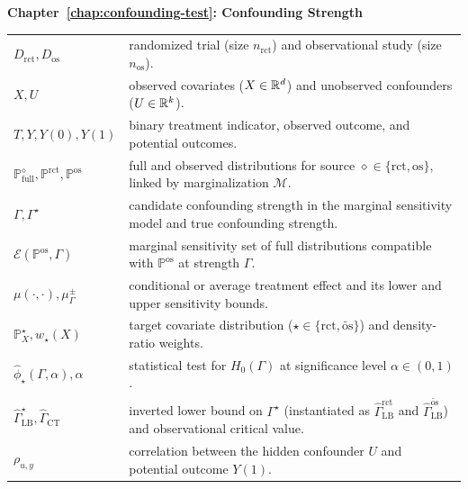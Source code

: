 \medskip
\noindent\textbf{Chapter~\ref{chap:confounding-test}: Confounding Strength}\par\smallskip
\begin{tabularx}{\textwidth}{lX}
  \(D_{\mathrm{rct}}, D_{\mathrm{os}}\) & randomized trial (size \(n_{\mathrm{rct}}\)) and observational study (size \(n_{\mathrm{os}}\)). \\
  \(X, U\) & observed covariates (\(X \in \mathbb{R}^d\)) and unobserved confounders (\(U \in \mathbb{R}^k\)). \\
  \(T, Y, Y(0), Y(1)\) & binary treatment indicator, observed outcome, and potential outcomes. \\
  \(\mathbb{P}^{\diamond}_{\mathrm{full}}, \mathbb{P}^{\mathrm{rct}}, \mathbb{P}^{\mathrm{os}}\) & full and observed distributions for source \(\diamond \in \{\mathrm{rct}, \mathrm{os}\}\), linked by marginalization \(\mathcal{M}\). \\
  \(\Gamma, \Gamma^{\star}\) & candidate confounding strength in the marginal sensitivity model and true confounding strength. \\
  \(\mathcal{E}(\mathbb{P}^{\mathrm{os}}, \Gamma)\) & marginal sensitivity set of full distributions compatible with \(\mathbb{P}^{\mathrm{os}}\) at strength \(\Gamma\). \\
  \(\mu(\cdot,\cdot), \mu^{\pm}_{\Gamma}\) & conditional or average treatment effect and its lower and upper sensitivity bounds. \\
  \(\mathbb{P}^{\star}_X, w_{\star}(X)\) & target covariate distribution (\(\star \in \{\mathrm{rct}, \widetilde{\mathrm{os}}\}\)) and density-ratio weights. \\
  \(\widehat{\phi}_{\star}(\Gamma,\alpha), \alpha\) & statistical test for \(H_0(\Gamma)\) at significance level \(\alpha \in (0,1)\). \\
  \(\widehat{\Gamma}_{\mathrm{LB}}^{\star}, \widehat{\Gamma}_{\mathrm{CT}}\) & inverted lower bound on \(\Gamma^{\star}\) (instantiated as \(\widehat{\Gamma}_{\mathrm{LB}}^{\mathrm{rct}}\) and \(\widehat{\Gamma}_{\mathrm{LB}}^{\widetilde{\mathrm{os}}}\)) and observational critical value. \\
  \(\rho_{u,y}\) & correlation between the hidden confounder \(U\) and potential outcome \(Y(1)\). \\
\end{tabularx}

